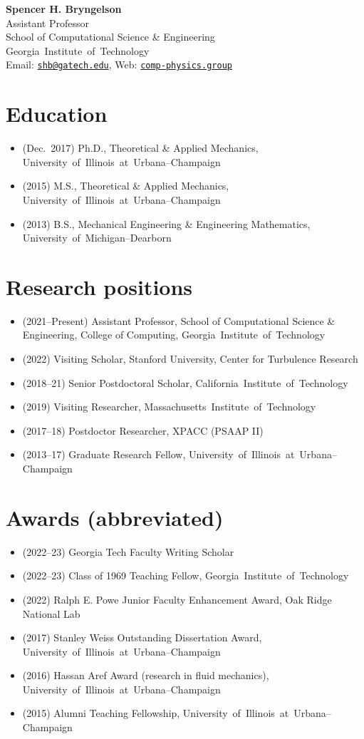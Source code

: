 \documentclass[11pt]{article}
\newcommand\GIT{\mbox{Georgia Institute of Technology}\xspace}
\newcommand\CIT{\mbox{California Institute of Technology}\xspace}
\newcommand\MIT{\mbox{Massachusetts Institute of Technology}\xspace}
\newcommand\UIUC{\mbox{University of Illinois at Urbana--Champaign}\xspace}
\newcommand\UMD{\mbox{University of Michigan--Dearborn}\xspace}
\begin{document}
\begin{center}
    {\Large \bf Spencer H. Bryngelson} \\ \smallskip
    Assistant Professor \\ 
    School of Computational Science \& Engineering \\ \GIT \\ \smallskip
    Email: \href{mailto:shb@gatech.edu}{\texttt{shb@gatech.edu}}, Web:
    \href{https://comp-physics.group}{\texttt{comp-physics.group}}
\end{center}

\section*{Education}

\begin{itemize}
    \item (Dec.\ 2017) Ph.D., Theoretical \& Applied Mechanics, \UIUC
    \item (2015) M.S., Theoretical \& Applied Mechanics, \UIUC
    \item (2013) B.S., Mechanical Engineering \& Engineering Mathematics, \UMD
\end{itemize}


\section*{Research positions}

\begin{itemize}
    \item (2021--Present) Assistant Professor, School of Computational Science \& Engineering, College of Computing, \GIT
    \item (2022) Visiting Scholar, Stanford University, Center for Turbulence Research
    \item (2018--21) Senior Postdoctoral Scholar, \CIT
    \item (2019) Visiting Researcher, \MIT
    \item (2017--18) Postdoctor Researcher, XPACC (PSAAP II)
    \item (2013--17) Graduate Research Fellow, \UIUC
\end{itemize}

\section*{Awards (abbreviated)}

\begin{itemize}
    \item (2022--23) Georgia Tech Faculty Writing Scholar
    \item (2022--23) Class of 1969 Teaching Fellow, \GIT
    \item (2022) Ralph E. Powe Junior Faculty Enhancement Award, Oak Ridge National Lab
    \item (2017) Stanley Weiss Outstanding Dissertation Award, \UIUC
    \item (2016) Hassan Aref Award (research in fluid mechanics), \UIUC
    \item (2015) Alumni Teaching Fellowship, \UIUC
\end{itemize}
\end{document}
